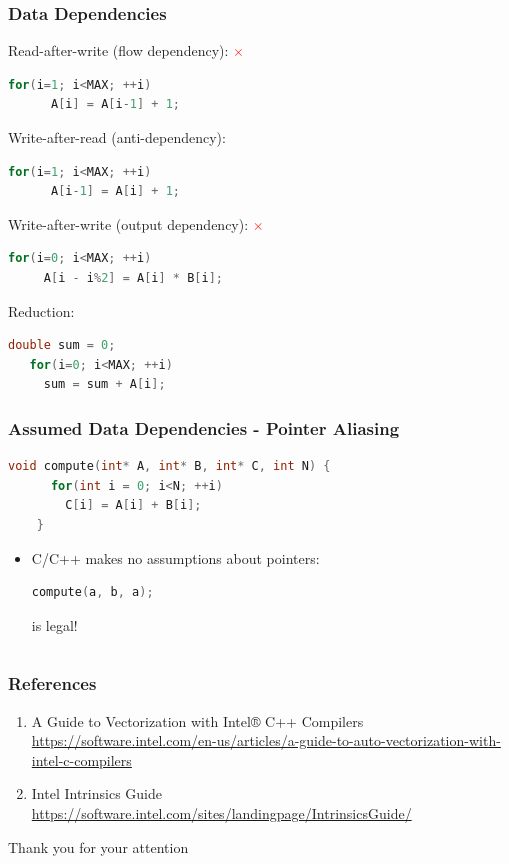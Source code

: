 \documentclass{beamer}
\begin{document}
\begin{frame}[fragile]
  \frametitle{Data Dependencies}
  Read-after-write (flow dependency): \textcolor{red}{$\times$}
  \begin{lstlisting}[language=C++]
    for(i=1; i<MAX; ++i) 
      A[i] = A[i-1] + 1;
  \end{lstlisting}
  Write-after-read (anti-dependency): \textcolor{green}{\checkmark}
  \begin{lstlisting}[language=C++]
    for(i=1; i<MAX; ++i) 
      A[i-1] = A[i] + 1;
  \end{lstlisting}
  Write-after-write (output dependency): \textcolor{red}{$\times$}
  \begin{lstlisting}[language=C++]
   for(i=0; i<MAX; ++i)
     A[i - i%2] = A[i] * B[i]; 
  \end{lstlisting}
  Reduction: \textcolor{green}{\checkmark}
  \begin{lstlisting}[language=C++]
   double sum = 0;
   for(i=0; i<MAX; ++i)
     sum = sum + A[i];
  \end{lstlisting}
\end{frame}

\begin{frame}[fragile]
  \frametitle{Assumed Data Dependencies - Pointer Aliasing}
  \begin{lstlisting}[language=C++]
    void compute(int* A, int* B, int* C, int N) {
      for(int i = 0; i<N; ++i) 
        C[i] = A[i] + B[i];
    }
  \end{lstlisting}
  
  \begin{itemize}
   \item C/C++ makes no assumptions about pointers:
   \begin{lstlisting}[language=C++]
      compute(a, b, a);
  \end{lstlisting}
  is legal!
  \end{itemize}

  
  
  \begin{lstlisting}[language=C++]

  \end{lstlisting}
\end{frame}

\begin{frame} 
 \frametitle{References}
 \begin{enumerate}
  \item A Guide to Vectorization with Intel® C++ Compilers \url{https://software.intel.com/en-us/articles/a-guide-to-auto-vectorization-with-intel-c-compilers}
  \item Intel Intrinsics Guide \url{https://software.intel.com/sites/landingpage/IntrinsicsGuide/}
 \end{enumerate}

 

\end{frame}

\begin{frame} 
 Thank you for your attention
\end{frame}
\end{document}
